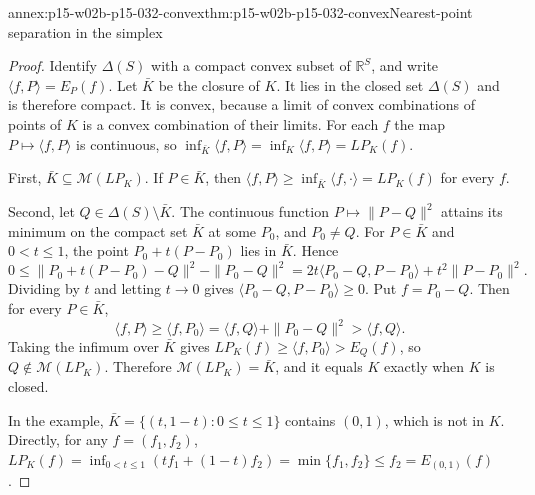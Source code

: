 \begin{annexitem}{annex:p15-w02b-p15-032-convex}{thm:p15-w02b-p15-032-convex}{Nearest-point separation in the simplex}
\begin{proof}
Identify \(\Delta(S)\) with a compact convex subset of \(\mathbb R^S\), and
write \(\langle f,P\rangle=E_P(f)\). Let \(\bar K\) be the closure of \(K\).
It lies in the closed set \(\Delta(S)\) and is therefore compact. It is
convex, because a limit of convex combinations of points of \(K\) is a
convex combination of their limits. For each \(f\) the map
\(P\mapsto\langle f,P\rangle\) is continuous, so
\(\inf_{\bar K}\langle f,P\rangle=\inf_K\langle f,P\rangle=LP_K(f)\).

First, \(\bar K\subseteq\mathcal M(LP_K)\). If \(P\in\bar K\), then
\(\langle f,P\rangle\geq\inf_{\bar K}\langle f,\cdot\rangle=LP_K(f)\) for
every \(f\).

Second, let \(Q\in\Delta(S)\setminus\bar K\). The continuous function
\(P\mapsto\|P-Q\|^2\) attains its minimum on the compact set \(\bar K\) at
some \(P_0\), and \(P_0\neq Q\). For \(P\in\bar K\) and \(0<t\leq1\), the point
\(P_0+t(P-P_0)\) lies in \(\bar K\). Hence
\[
 0\leq\|P_0+t(P-P_0)-Q\|^2-\|P_0-Q\|^2
   =2t\langle P_0-Q,P-P_0\rangle+t^2\|P-P_0\|^2 .
\]
Dividing by \(t\) and letting \(t\to0\) gives
\(\langle P_0-Q,P-P_0\rangle\geq0\). Put \(f=P_0-Q\). Then for every
\(P\in\bar K\),
\[
 \langle f,P\rangle\geq\langle f,P_0\rangle
 =\langle f,Q\rangle+\|P_0-Q\|^2>\langle f,Q\rangle .
\]
Taking the infimum over \(\bar K\) gives
\(LP_K(f)\geq\langle f,P_0\rangle>E_Q(f)\), so \(Q\notin\mathcal M(LP_K)\).
Therefore \(\mathcal M(LP_K)=\bar K\), and it equals \(K\) exactly when \(K\)
is closed.

In the example, \(\bar K=\{(t,1-t):0\leq t\leq1\}\) contains \((0,1)\), which
is not in \(K\). Directly, for any \(f=(f_1,f_2)\),
\(LP_K(f)=\inf_{0<t\leq1}(tf_1+(1-t)f_2)=\min\{f_1,f_2\}\leq f_2=E_{(0,1)}(f)\).
\end{proof}\end{annexitem}

